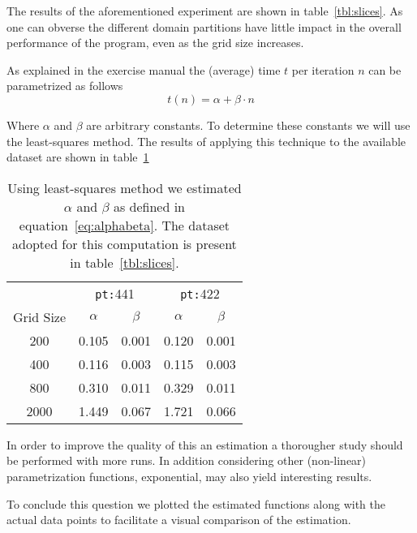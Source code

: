 The results of the aforementioned experiment are shown in table~\ref{tbl:slices}. As one can obverse the different domain partitions have little impact in the overall performance of the program, even as the grid size increases.


As explained in the exercise manual the (average) time $t$ per iteration $n$ can be parametrized as follows
\begin{equation}
t(n) = \alpha + \beta \cdot n
\label{eq:alphabeta}
\end{equation}

Where $\alpha$ and $\beta$ are arbitrary constants. To determine these constants we will use the least-squares method. The results of applying this technique to the available dataset are shown in table~\ref{tbl:alphabeta}

\begin{table}[H]
\centering
\begin{tabular}{*{5}{c}}
 \toprule
            &    \multicolumn{2}{c}{\texttt{pt:}441} & \multicolumn{2}{c}{\texttt{pt:}422} \\
Grid Size   &    $\alpha$ &    $\beta$                & $\alpha$    & $\beta$ \\ \midrule
200         &    0.105    &    0.001                  & 0.120       & 0.001   \\
400         &    0.116    &    0.003                  & 0.115       & 0.003   \\
800         &    0.310    &    0.011                  & 0.329       & 0.011   \\
2000        &    1.449    &    0.067                  & 1.721       & 0.066   \\
\bottomrule
\end{tabular}
\caption{Using least-squares method we estimated $\alpha$ and $\beta$ as defined in equation~\ref{eq:alphabeta}. The dataset adopted for this computation is present in table~\ref{tbl:slices}.}
\label{tbl:alphabeta}
\end{table}

In order to improve the quality of this an estimation a thorougher study should be performed with more runs. In addition considering other (non-linear) parametrization functions, \eg exponential, may also yield interesting results.

To conclude this question we plotted the estimated functions along with the actual data points to facilitate a visual comparison of the estimation.


